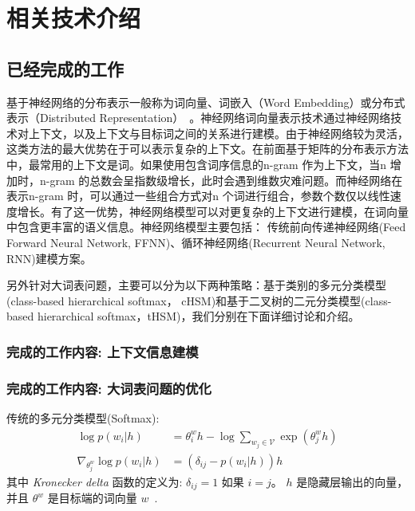 \documentclass[master,openright,twoside,color]{buaathesis}
\begin{document}
\mainmatter
\pagestyle{mainmatter}





\chapter{相关技术介绍}

\section{已经完成的工作}
基于神经网络的分布表示一般称为词向量、词嵌入（Word Embedding）或分布式表示（Distributed Representation）~。神经网络词向量表示技术通过神经网络技术对上下文，以及上下文与目标词之间的关系进行建模。由于神经网络较为灵活，这类方法的最大优势在于可以表示复杂的上下文。在前面基于矩阵的分布表示方法中，最常用的上下文是词。如果使用包含词序信息的n-gram 作为上下文，当n 增加时，n-gram 的总数会呈指数级增长，此时会遇到维数灾难问题。而神经网络在表示n-gram 时，可以通过一些组合方式对n 个词进行组合，参数个数仅以线性速度增长。有了这一优势，神经网络模型可以对更复杂的上下文进行建模，在词向量中包含更丰富的语义信息。神经网络模型主要包括： 传统前向传递神经网络(Feed Forward Neural Network, FFNN)、循环神经网络(Recurrent Neural Network, RNN)建模方案。

另外针对大词表问题，主要可以分为以下两种策略：基于类别的多元分类模型(class-based hierarchical softmax， cHSM)和基于二叉树的二元分类模型(class-based hierarchical softmax，tHSM)，我们分别在下面详细讨论和介绍。


\subsection{完成的工作内容: 上下文信息建模}


\subsection{完成的工作内容: 大词表问题的优化}
传统的多元分类模型(Softmax):
\begin{equation}
\label{eq:softmax}
\begin{split}
\log p(w_i|h) &= \theta^w_i h-\log \sum_{w_j\in \mathcal{V}}{\exp(\theta^w_j h)}\\
\nabla_{\theta^w_j}{\log p(w_i|h)}&= (\delta_{ij}-p(w_i|h))h
\end{split}
\end{equation}
其中 \textit{Kronecker delta} 函数的定义为: $\delta_{ij} = 1$ 如果 $i = j$。 $h$ 是隐藏层输出的向量，并且 $\theta^w$ 是目标端的词向量 $w$~.
\end{document}
